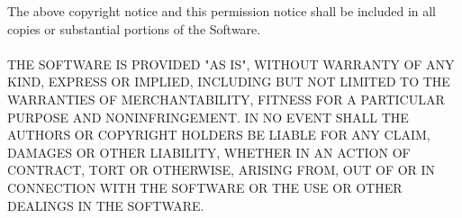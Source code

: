 The above copyright notice and this permission notice shall be included in all
copies or substantial portions of the Software.\\\\

THE SOFTWARE IS PROVIDED "AS IS", WITHOUT WARRANTY OF ANY KIND, EXPRESS OR
IMPLIED, INCLUDING BUT NOT LIMITED TO THE WARRANTIES OF MERCHANTABILITY,
FITNESS FOR A PARTICULAR PURPOSE AND NONINFRINGEMENT. IN NO EVENT SHALL THE 
AUTHORS OR COPYRIGHT HOLDERS BE LIABLE FOR ANY CLAIM, DAMAGES OR OTHER
LIABILITY, WHETHER IN AN ACTION OF CONTRACT, TORT OR OTHERWISE, ARISING FROM,
OUT OF OR IN CONNECTION WITH THE SOFTWARE OR THE USE OR OTHER DEALINGS IN THE 
SOFTWARE.

